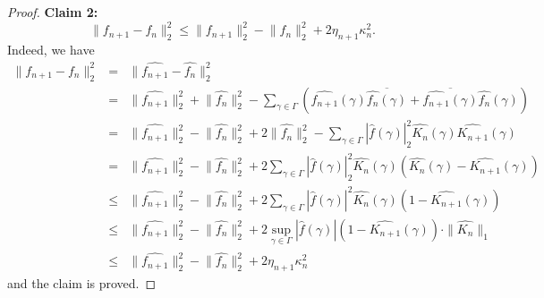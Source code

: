 \begin{proof}
\noindent	\textbf{Claim 2:} 
    \[
        \lVert f_{n+1} - f_n \rVert_2^2 \leq \lVert f_{n+1} \rVert_2^2 - \lVert f_n \rVert_2^2 + 2 \eta_{n+1} \kappa_n^2.
    \]
	Indeed, we have
	\begin{eqnarray*}
	\lVert f_{n+1} - f_n \rVert_2^2 
&= &	\lVert \widehat{f_{n+1}} - \widehat{f_n} \rVert_2^2 \\
&= &	\lVert \widehat{f_{n+1}} \rVert_2^2 + \lVert \widehat{f_n} \rVert_2^2 - \sum_{\gamma \in \Gamma} 
\left(\widehat{f_{n+1}}(\gamma) \overline{\widehat{f_{n}}(\gamma)} + \overline{\widehat{f_{n+1}}(\gamma)} \widehat{f_{n}}(\gamma) \right)\\
&= &	\lVert \widehat{f_{n+1}} \rVert_2^2 - \lVert \widehat{f_n} \rVert_2^2 + 2 \lVert \widehat{f_n} \rVert_2^2 - \sum_{\gamma \in \Gamma}	\left| \widehat{f}(\gamma) \right|_2^2 \widehat{K_n}(\gamma) \widehat{K_{n+1}}(\gamma)\\
&= & \lVert \widehat{f_{n+1}} \rVert_2^2 - \lVert \widehat{f_n} \rVert_2^2 + 2 \sum_{\gamma \in \Gamma}	\left| \widehat{f}(\gamma) \right|_2^2 \widehat{K_n}(\gamma) 
\left( \widehat{K_n}(\gamma) - \widehat{K_{n+1}}(\gamma) \right)\\
& \leq & \lVert \widehat{f_{n+1}} \rVert_2^2 - \lVert \widehat{f_n} \rVert_2^2 + 2 \sum_{\gamma \in \Gamma}	\left| \widehat{f}(\gamma) \right|^2 \widehat{K_n}(\gamma) 
\left(1 - \widehat{K_{n+1}}(\gamma) \right) \\
& \leq & \lVert \widehat{f_{n+1}} \rVert_2^2 - \lVert \widehat{f_n} \rVert_2^2 + 2 \sup_{\gamma \in \Gamma} |\widehat{f}(\gamma)| \left( 1 - \widehat{K_{n+1}}(\gamma) \right) \cdot \| \widehat{K_n} \|_1 \\
& \leq & \lVert \widehat{f_{n+1}} \rVert_2^2 - \lVert \widehat{f_n} \rVert_2^2 + 2 \eta_{n+1} \kappa_n^2
	\end{eqnarray*}
 and the claim is proved.
   

\end{proof}
